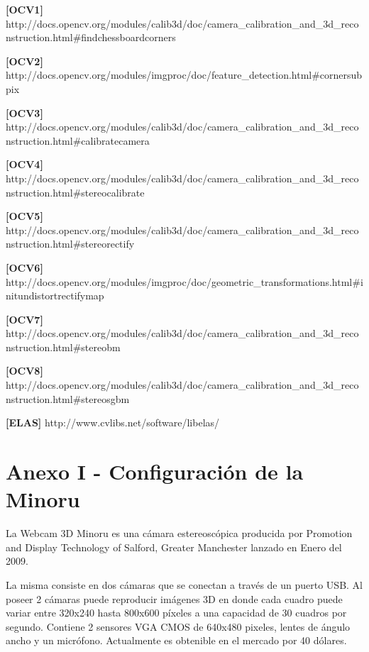\documentclass[11pt,a4paper,titlepage]{article}
\begin{document}
\begin{sloppypar}
\textbf{[OCV1]} http:\slash\slash docs.opencv.org\slash modules\slash calib3d\slash doc\slash camera\_calibration\_and\_3d\_reconstruction.html\#findchessboardcorners

\textbf{[OCV2]} http:\slash \slash docs.opencv.org\slash modules\slash imgproc\slash doc\slash feature\_detection.html\#cornersubpix

\textbf{[OCV3]} http:\slash \slash docs.opencv.org\slash modules\slash calib3d\slash doc\slash camera\_calibration\_and\_3d\_reconstruction.html\#calibratecamera

\textbf{[OCV4]} http:\slash \slash docs.opencv.org\slash modules\slash calib3d\slash doc\slash camera\_calibration\_and\_3d\_reconstruction.html\#stereocalibrate

\textbf{[OCV5]} http:\slash \slash docs.opencv.org\slash modules\slash calib3d\slash doc\slash camera\_calibration\_and\_3d\_reconstruction.html\#stereorectify

\textbf{[OCV6]} http:\slash \slash docs.opencv.org\slash modules\slash imgproc\slash doc\slash geometric\_transformations.html\#initundistortrectifymap

\textbf{[OCV7]} http:\slash \slash docs.opencv.org\slash modules\slash calib3d\slash doc\slash camera\_calibration\_and\_3d\_reconstruction.html\#stereobm

\textbf{[OCV8]} http:\slash \slash docs.opencv.org\slash modules\slash calib3d\slash doc\slash camera\_calibration\_and\_3d\_reconstruction.html\#stereosgbm
\end{sloppypar}

\textbf{[ELAS]} http://www.cvlibs.net/software/libelas/

\newpage

\section{Anexo I - Configuración de la Minoru}

La Webcam 3D Minoru es una cámara estereoscópica producida por Promotion and Display Technology of Salford, Greater Manchester lanzado en Enero del 2009.

La misma consiste en dos cámaras que se conectan a través de un puerto USB. Al poseer 2 cámaras puede reproducir imágenes 3D en donde cada cuadro puede variar entre 320x240 hasta 800x600 píxeles a una capacidad de 30 cuadros por segundo. Contiene 2 sensores VGA CMOS de 640x480 pixeles, lentes de ángulo ancho y un micrófono. Actualmente es obtenible en el mercado por 40 dólares.
\end{document}
